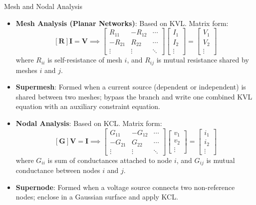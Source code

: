 \begin{formulabox}{Mesh and Nodal Analysis}
\begin{itemize}[leftmargin=1.5em]
    \item \textbf{Mesh Analysis (Planar Networks)}: Based on KVL. Matrix form:
    \[ [\mathbf{R}]\mathbf{I} = \mathbf{V} \implies \begin{bmatrix} R_{11} & -R_{12} & \cdots \\ -R_{21} & R_{22} & \cdots \\ \vdots & \vdots & \ddots \end{bmatrix} \begin{bmatrix} I_1 \\ I_2 \\ \vdots \end{bmatrix} = \begin{bmatrix} V_1 \\ V_2 \\ \vdots \end{bmatrix} \]
    where $R_{ii}$ is self-resistance of mesh $i$, and $R_{ij}$ is mutual resistance shared by meshes $i$ and $j$.
    \item \textbf{Supermesh}: Formed when a current source (dependent or independent) is shared between two meshes; bypass the branch and write one combined KVL equation with an auxiliary constraint equation.
    \item \textbf{Nodal Analysis}: Based on KCL. Matrix form:
    \[ [\mathbf{G}]\mathbf{V} = \mathbf{I} \implies \begin{bmatrix} G_{11} & -G_{12} & \cdots \\ -G_{21} & G_{22} & \cdots \\ \vdots & \vdots & \ddots \end{bmatrix} \begin{bmatrix} v_1 \\ v_2 \\ \vdots \end{bmatrix} = \begin{bmatrix} i_1 \\ i_2 \\ \vdots \end{bmatrix} \]
    where $G_{ii}$ is sum of conductances attached to node $i$, and $G_{ij}$ is mutual conductance between nodes $i$ and $j$.
    \item \textbf{Supernode}: Formed when a voltage source connects two non-reference nodes; enclose in a Gaussian surface and apply KCL.
\end{itemize}
\end{formulabox}

